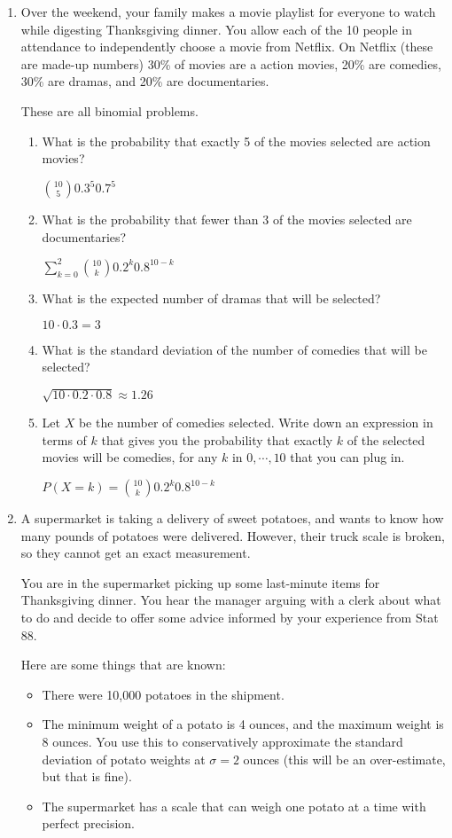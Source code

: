 \documentclass[11pt]{article}
\begin{document}
\begin{enumerate}
\item Over the weekend, your family makes a movie playlist for everyone to watch while digesting Thanksgiving dinner. You allow each of the 10 people in attendance to independently choose a movie from Netflix. On Netflix (these are made-up numbers) 30\% of movies are a action movies, 20\% are comedies, 30\% are dramas, and 20\% are documentaries.

{\color{red} These are all binomial problems.}

\begin{enumerate}
\item What is the probability that exactly 5 of the movies selected are action movies?

{\color{red}
${10 \choose 5}0.3^5 0.7^5$
}
\item What is the probability that fewer than 3 of the movies selected are documentaries?

{\color{red}
$\sum_{k=0}^2 {10 \choose k}0.2^k 0.8^{10-k}$
}
\item What is the expected number of dramas that will be selected?

{\color{red}
$10 \cdot 0.3 = 3$
}
\item What is the standard deviation of the number of comedies that will be selected?

{\color{red}
$\sqrt{10 \cdot 0.2 \cdot 0.8} \approx 1.26$
}
\item Let $X$ be the number of comedies selected. Write down an expression in terms of $k$ that gives you the probability that exactly $k$ of the selected movies will be comedies, for any $k$ in $0, \cdots, 10$ that you can plug in.

{\color{red}
$P(X = k) = {10 \choose k}0.2^k 0.8^{10-k}$
}
\end{enumerate}

\item A supermarket is taking a delivery of sweet potatoes, and wants to know how many pounds of potatoes were delivered. However, their truck scale is broken, so they cannot get an exact measurement.

You are in the supermarket picking up some last-minute items for Thanksgiving dinner. You hear the manager arguing with a clerk about what to do and decide to offer some advice informed by your experience from Stat 88.

Here are some things that are known:
\begin{itemize}
\item There were 10,000 potatoes in the shipment.
\item The minimum weight of a potato is 4 ounces, and the maximum weight is 8 ounces. You use this to conservatively approximate the standard deviation of potato weights at $\sigma = 2$ ounces (this will be an over-estimate, but that is fine).
\item The supermarket has a scale that can weigh one potato at a time with perfect precision.
\end{itemize}


\end{enumerate}
\end{document}
